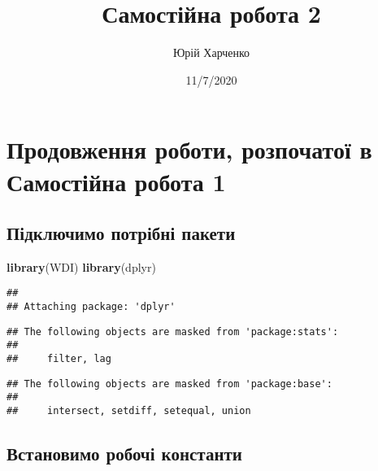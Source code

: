 \documentclass[
]{article}
\title{Самостійна робота 2}
\author{Юрій Харченко}
\date{11/7/2020}
\newenvironment{Shaded}{\begin{snugshade}}{\end{snugshade}}
\newcommand{\KeywordTok}[1]{\textcolor[rgb]{0.13,0.29,0.53}{\textbf{#1}}}
\newcommand{\NormalTok}[1]{#1}
\begin{document}
\maketitle

\hypertarget{ux43fux440ux43eux434ux43eux432ux436ux435ux43dux43dux44f-ux440ux43eux431ux43eux442ux438-ux440ux43eux437ux43fux43eux447ux430ux442ux43eux457-ux432-ux441ux430ux43cux43eux441ux442ux456ux439ux43dux430-ux440ux43eux431ux43eux442ux430-1}{%
\section{Продовження роботи, розпочатої в Самостійна робота
1}\label{ux43fux440ux43eux434ux43eux432ux436ux435ux43dux43dux44f-ux440ux43eux431ux43eux442ux438-ux440ux43eux437ux43fux43eux447ux430ux442ux43eux457-ux432-ux441ux430ux43cux43eux441ux442ux456ux439ux43dux430-ux440ux43eux431ux43eux442ux430-1}}

\hypertarget{ux43fux456ux434ux43aux43bux44eux447ux438ux43cux43e-ux43fux43eux442ux440ux456ux431ux43dux456-ux43fux430ux43aux435ux442ux438}{%
\subsection{Підключимо потрібні
пакети}\label{ux43fux456ux434ux43aux43bux44eux447ux438ux43cux43e-ux43fux43eux442ux440ux456ux431ux43dux456-ux43fux430ux43aux435ux442ux438}}

\begin{Shaded}
\begin{Highlighting}[]
\KeywordTok{library}\NormalTok{(WDI)}
\KeywordTok{library}\NormalTok{(dplyr)}
\end{Highlighting}
\end{Shaded}

\begin{verbatim}
## 
## Attaching package: 'dplyr'
\end{verbatim}

\begin{verbatim}
## The following objects are masked from 'package:stats':
## 
##     filter, lag
\end{verbatim}

\begin{verbatim}
## The following objects are masked from 'package:base':
## 
##     intersect, setdiff, setequal, union
\end{verbatim}

\hypertarget{ux432ux441ux442ux430ux43dux43eux432ux438ux43cux43e-ux440ux43eux431ux43eux447ux456-ux43aux43eux43dux441ux442ux430ux43dux442ux438}{%
\subsection{Встановимо робочі
константи}\label{ux432ux441ux442ux430ux43dux43eux432ux438ux43cux43e-ux440ux43eux431ux43eux447ux456-ux43aux43eux43dux441ux442ux430ux43dux442ux438}}
\end{document}
